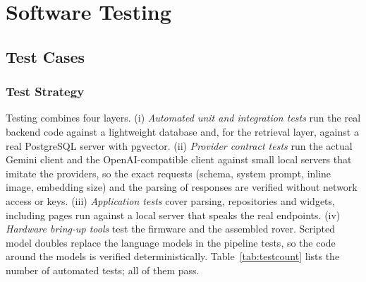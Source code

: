 \chapter{Software Testing}

\section{Test Cases}

\subsection{Test Strategy}

Testing combines four layers. (i) \emph{Automated unit and integration tests} run the real backend code against a lightweight database and,
for the retrieval layer, against a real PostgreSQL server with pgvector. (ii) \emph{Provider contract tests} run the actual Gemini
client and the OpenAI-compatible client against small local servers that imitate the providers, so the exact requests
(schema, system prompt, inline image, embedding size) and the parsing of responses are verified without network access or
keys. (iii) \emph{Application tests} cover parsing, repositories and widgets, including pages run against a local server that
speaks the real endpoints. (iv) \emph{Hardware bring-up tools} test the firmware and the assembled rover.
Scripted model doubles replace the language models in the pipeline tests, so the code around the models is
verified deterministically. Table~\ref{tab:testcount} lists the number of automated tests; all of them pass.

